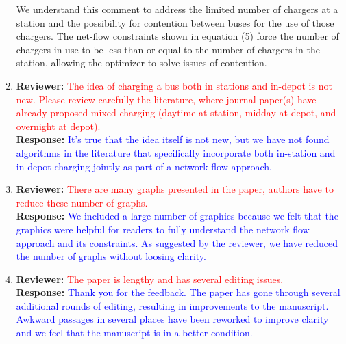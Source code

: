 \documentclass{article}
\newcommand\formatfeedback[2]
{%
	\textbf{Reviewer:} \textcolor{red}{#1} 
	\\[0.1in] \textbf{Response:} \textcolor{blue}{#2}
}
\begin{document}
\begin{enumerate}
			     {We understand this comment to address the limited number of chargers at a station and the possibility for contention between buses for the use of those chargers. The net-flow constraints shown in equation (5) force the number of chargers in use to be less than or equal to the number of chargers in the station, allowing the optimizer to solve issues of contention.}
	\item \formatfeedback{The idea of charging a bus both in stations and in-depot is not new.  Please review carefully the literature, where journal paper(s) have already proposed mixed charging (daytime at station, midday at depot, and overnight at depot).}%
			     {It's true that the idea itself is not new, but we have not found algorithms in the literature that specifically incorporate both in-station and in-depot charging jointly as part of a network-flow approach.} 
	\item \formatfeedback{There are many graphs presented in the paper, authors have to reduce these number of graphs.}%
			     {We included a large number of graphics because we felt that the graphics were helpful for readers to fully understand the network flow approach and its constraints. As suggested by the reviewer, we have reduced the number of graphs without loosing clarity.} 
	\item \formatfeedback{The paper is lengthy and has several editing issues.}%
			     {Thank you for the feedback. The paper has gone through several additional rounds of editing, resulting in improvements to the manuscript.  Awkward passages in several places have been reworked to improve clarity and we feel that the manuscript is in a better condition.} 
\end{enumerate}
\end{document}
